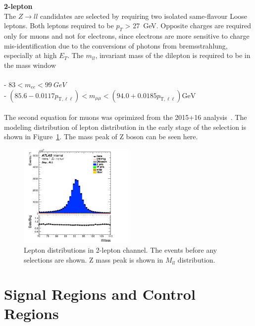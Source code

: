 \noindent\textbf{2-lepton} \\
The $Z \rightarrow ll$ candidates are selected by requiring two isolated same-flavour Loose leptons. Both leptons required to be $p_T$ > 27~GeV. Opposite charges are required only for muons and not for electrons, since electrons are more sensitive to charge mis-identification due to the conversions of photons from bremsstrahlung, especially at high $E_T$.
The $m_{ll}$, invariant mass of the dilepton is required to be in the mass window \\ \\
- $83 < m_{ee}< 99~GeV$ \\ 
- $\left(85.6-0.0117 p_{\mathrm{T}, \ell \ell}\right)<m_{\mu \mu}<\left(94.0+0.0185 p_{\mathrm{T}, \ell \ell}\right) \mathrm{GeV}$ \\ \\
The second equation for muons was oprimized from the 2015+16 analysis~\cite{}. 
The modeling distribution of lepton distribution in the early stage of the selection is shown in Figure~\ref{fig:2lepLeptons}. The mass peak of Z boson can be seen here.

\begin{figure}[ht]
    \centering
    \includegraphics[width=0.5\textwidth]{figures/2lep/dataMC/C_0ptag1pfat0pjet_0ptv_ALL_llMass_Lin.png}
    \caption{Lepton distributions in 2-lepton channel. The events before any selections are shown. Z mass peak is shown in $M_{ll}$ distribution.}
    \label{fig:2lepLeptons}
\end{figure}

\section{Signal Regions and Control Regions}

